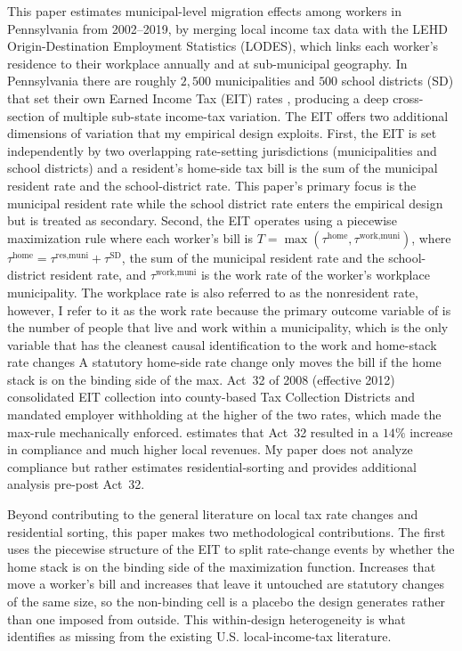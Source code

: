 \documentclass[12pt]{article}
\begin{document}
This paper estimates municipal-level migration effects among workers in Pennsylvania from 2002--2019, by merging local income tax data with the LEHD Origin-Destination
Employment Statistics (LODES), which links each worker's residence to their workplace annually and at sub-municipal geography. In Pennsylvania there are roughly $2{,}500$ municipalities and $500$ school districts (SD) that set
their own Earned Income Tax (EIT) rates
\citep{bagchiEffectsIntroducingWithholding2022,agrawalLessonsStateLocal},
producing a deep cross-section of multiple sub-state income-tax variation. The EIT offers two additional dimensions of variation that my
empirical design exploits. First, the EIT is set independently by two
overlapping rate-setting jurisdictions (municipalities and school
districts) and a resident's home-side tax bill is the sum of the
municipal resident rate and the school-district rate. This paper's primary
focus is the municipal resident rate while the school district rate enters the empirical
design but is treated as secondary.
Second, the EIT operates using a piecewise maximization rule where each worker's bill is
$T = \max(\tau^{\text{home}}, \tau^{\text{work,muni}})$, where
$\tau^{\text{home}} = \tau^{\text{res,muni}} + \tau^{\text{SD}}$, the
sum of the municipal resident rate and the school-district resident
rate, and $\tau^{\text{work,muni}}$ is the
work rate of the worker's workplace municipality. The workplace rate is also referred to as the nonresident rate, however, I refer to it as the work rate because the primary outcome variable of is the number of people that live and work within a municipality, which is the only variable that has the cleanest causal identification to the work and home-stack rate changes A statutory home-side rate
change only moves the bill if the home stack is on the binding side
of the max. Act~32 of 2008 (effective 2012) consolidated EIT
collection into county-based Tax Collection Districts and mandated
employer withholding at the higher of the two rates, which made the
max-rule mechanically enforced.
\citet{bagchiEffectsIntroducingWithholding2022} estimates that Act~32 resulted in a $14 \%$ increase in compliance and much higher local revenues. My paper does not analyze compliance but rather estimates
residential-sorting and provides additional analysis pre-post Act~32.

Beyond contributing to the general literature on local tax rate changes and residential sorting, this paper makes two methodological contributions. The first uses the piecewise structure of the EIT to split rate-change events by whether the home stack is on the binding side of the maximization function. Increases that move a worker's bill and increases that leave it untouched are statutory changes of the same size, so the non-binding cell is a placebo the design generates rather than one imposed from outside. This within-design heterogeneity is what \citet{agrawalLessonsStateLocal} identifies as missing from the existing U.S. local-income-tax literature.
\end{document}
